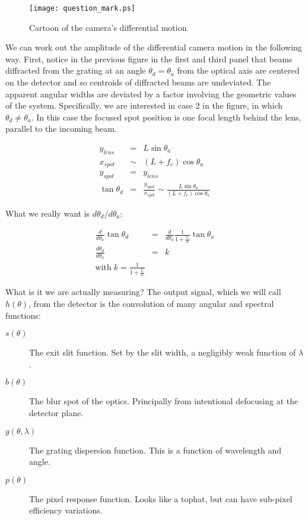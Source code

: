 \begin{figure}
\begin{center}
    \texttt{[image: question\_mark.ps]}
  \end{center}
  \caption[Differential camera motion]{Cartoon of the camera's differential motion}
\end{figure}

We can work out the amplitude of the differential camera motion in the following way.  First, notice in the previous figure in the first and third panel that beams diffracted from the grating at an angle $\theta_{d} = \theta_{a}$ from the optical axis are centered on the detector and so centroids of diffracted beams are undeviated.  The apparent angular widths are deviated by a factor involving the geometric values of the system.  Specifically, we are interested in case 2 in the figure, in which $\theta_{d} \ne \theta_{a}$.  In this case the focused spot position is one focal length behind the lens, parallel to the incoming beam.

\begin{eqnarray}
	y_{lens}&=&L \sin{\theta_a} \nonumber \\
	x_{spot}&\sim&(L+f_c)\cos{\theta_a}  \nonumber \\
	y_{spot}&=&y_{lens} \nonumber \\
	\tan{\theta_d} &=& \frac{y_{spot}}{x_{spot}} \sim \frac{L \sin{\theta_a}}{ (L+f_c)\cos{\theta_a}}  \nonumber 
\end{eqnarray}

What we really want is $d\theta_d/d\theta_a$:

\begin{eqnarray}
	\frac{d}{d\theta_a} \tan{\theta_d} &=& \frac{d}{d\theta_a} \frac{1}{1+\frac{f_c}{L}} \tan{\theta_a} \nonumber \\
	\frac{d\theta_d}{d\theta_a} &=& k  \nonumber \\
	\mathrm{with \;}k=\frac{1}{1+\frac{f_c}{L}}  \nonumber 
\end{eqnarray}

What is it we are actually measuring?  The output signal, which we will call $h(\theta)$, from the detector is the convolution of many angular and spectral functions:
\begin{description}
\item[$s(\theta)$]	The exit slit function. Set by the slit width, a negligibly weak function of $\lambda$.
\item[$b(\theta)$]	The blur spot of the optics. Principally from intentional defocusing at the detector plane.
\item[$g(\theta, \lambda)$]	The grating dispersion function.  This is a function of wavelength and angle. 
\item[$p(\theta)$]	The pixel response function.  Looks like a tophat, but can have sub-pixel efficiency variations.
\end{description}

